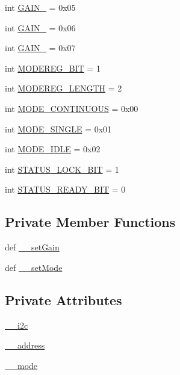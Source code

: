 \begin{DoxyCompactItemize}
int \hyperlink{classconcretesensor_1_1hmc5883l_1_1HMC5883L_a81160fec399e0f533dbc23f32a659dd8}{G\+A\+I\+N\+\_} = 0x05
\item 
int \hyperlink{classconcretesensor_1_1hmc5883l_1_1HMC5883L_a590390c013603f8c7a3e430796c387ad}{G\+A\+I\+N\+\_} = 0x06
\item 
int \hyperlink{classconcretesensor_1_1hmc5883l_1_1HMC5883L_a03354e72b41537d82c215c518f5e3f04}{G\+A\+I\+N\+\_} = 0x07
\item 
int \hyperlink{classconcretesensor_1_1hmc5883l_1_1HMC5883L_a667c6951744ff1bd6db1a64188e8dfb9}{M\+O\+D\+E\+R\+E\+G\+\_\+\+B\+I\+T} = 1
\item 
int \hyperlink{classconcretesensor_1_1hmc5883l_1_1HMC5883L_a7891ee2750d1163121e90941bf36acd0}{M\+O\+D\+E\+R\+E\+G\+\_\+\+L\+E\+N\+G\+T\+H} = 2
\item 
int \hyperlink{classconcretesensor_1_1hmc5883l_1_1HMC5883L_ac432a7836cfc588f6587204eba8d7f56}{M\+O\+D\+E\+\_\+\+C\+O\+N\+T\+I\+N\+U\+O\+U\+S} = 0x00
\item 
int \hyperlink{classconcretesensor_1_1hmc5883l_1_1HMC5883L_ac2e902f9d340ab7af8bf92fa2787320b}{M\+O\+D\+E\+\_\+\+S\+I\+N\+G\+L\+E} = 0x01
\item 
int \hyperlink{classconcretesensor_1_1hmc5883l_1_1HMC5883L_a31593d8302ea4993a8b178e6466d9a31}{M\+O\+D\+E\+\_\+\+I\+D\+L\+E} = 0x02
\item 
int \hyperlink{classconcretesensor_1_1hmc5883l_1_1HMC5883L_a4fec843d6f9fffa83fc9294152d6c3bf}{S\+T\+A\+T\+U\+S\+\_\+\+L\+O\+C\+K\+\_\+\+B\+I\+T} = 1
\item 
int \hyperlink{classconcretesensor_1_1hmc5883l_1_1HMC5883L_a713737acb08d81e867515ea9eb4465d1}{S\+T\+A\+T\+U\+S\+\_\+\+R\+E\+A\+D\+Y\+\_\+\+B\+I\+T} = 0
\end{DoxyCompactItemize}
\subsection*{Private Member Functions}
\begin{DoxyCompactItemize}
\item 
def \hyperlink{classconcretesensor_1_1hmc5883l_1_1HMC5883L_a9cc6ed9750ce53103085bbad4f33a95c}{\+\_\+\+\_\+set\+Gain}
\item 
def \hyperlink{classconcretesensor_1_1hmc5883l_1_1HMC5883L_a465b8b7e7eebb5f028aeb38d854a850f}{\+\_\+\+\_\+set\+Mode}
\end{DoxyCompactItemize}
\subsection*{Private Attributes}
\begin{DoxyCompactItemize}
\item 
\hyperlink{classconcretesensor_1_1hmc5883l_1_1HMC5883L_a2076fa8544920749b69bdb8909509d85}{\+\_\+\+\_\+i2c}
\item 
\hyperlink{classconcretesensor_1_1hmc5883l_1_1HMC5883L_a1887738162acc06d8da5efbb6e4d0da4}{\+\_\+\+\_\+address}
\item 
\hyperlink{classconcretesensor_1_1hmc5883l_1_1HMC5883L_a38c07ecf1facc6a5b6bd6af68133a141}{\+\_\+\+\_\+mode}
\end{DoxyCompactItemize}



